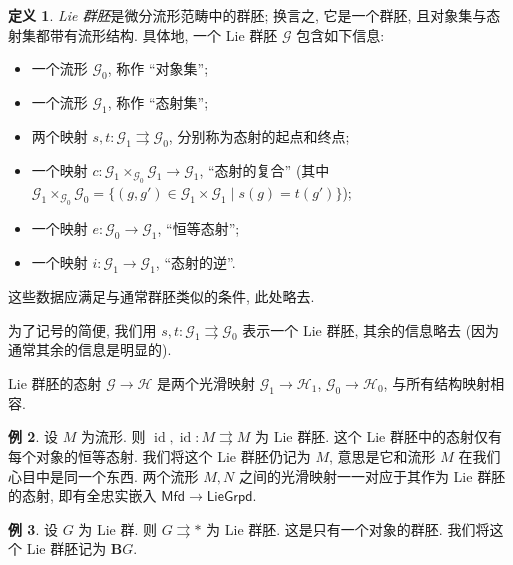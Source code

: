 \documentclass{article}
\theoremstyle{definition}
\newtheorem{definition}{定义}[section]
\newtheorem{example}[definition]{例}
\newcommand{\Mfd}{\mathsf{Mfd}}
\newcommand{\LieGrpd}{\mathsf{LieGrpd}}
\begin{document}
	\begin{definition}
		\emph{Lie 群胚}是微分流形范畴中的群胚; 换言之, 它是一个群胚, 且对象集与态射集都带有流形结构. 具体地, 一个 Lie 群胚 $\mathcal G$ 包含如下信息:
		\begin{itemize}
			\item 一个流形 $\mathcal G_0$, 称作 ``对象集'';
			\item 一个流形 $\mathcal G_1$, 称作 ``态射集'';
			\item 两个映射 $s,t\colon \mathcal G_1\rightrightarrows \mathcal G_0$, 分别称为态射的起点和终点;
			\item 一个映射 $c\colon \mathcal G_1\times_{\mathcal G_0} \mathcal G_1\to \mathcal G_1$, ``态射的复合'' (其中 $\mathcal G_1\times_{\mathcal G_0} \mathcal G_0 = \{(g,g')\in \mathcal G_1\times \mathcal G_1\mid s(g)=t(g')\}$);
			\item 一个映射 $e\colon \mathcal G_0\to \mathcal G_1$, ``恒等态射'';
			\item 一个映射 $i\colon \mathcal G_1\to \mathcal G_1$, ``态射的逆''.
		\end{itemize}
		这些数据应满足与通常群胚类似的条件, 此处略去.
		
		为了记号的简便, 我们用 $s,t\colon \mathcal G_1\rightrightarrows \mathcal G_0$ 表示一个 Lie 群胚, 其余的信息略去 (因为通常其余的信息是明显的).
		
		Lie 群胚的态射 $\mathcal G\to\mathcal H$ 是两个光滑映射 $\mathcal G_1\to\mathcal H_1$, $\mathcal G_0\to\mathcal H_0$, 与所有结构映射相容.
	\end{definition}
	
	
	\begin{example}
		设 $M$ 为流形. 则 $\operatorname{id},\operatorname{id}\colon M\rightrightarrows M$ 为 Lie 群胚. 这个 Lie 群胚中的态射仅有每个对象的恒等态射. 我们将这个 Lie 群胚仍记为 $M$, 意思是它和流形 $M$ 在我们心目中是同一个东西. 两个流形 $M,N$ 之间的光滑映射一一对应于其作为 Lie 群胚的态射, 即有全忠实嵌入 $\Mfd\to\LieGrpd$.
	\end{example}
	
	\begin{example}
		设 $G$ 为 Lie 群. 则 $G\rightrightarrows *$ 为 Lie 群胚. 这是只有一个对象的群胚. 我们将这个 Lie 群胚记为 $\mathbf BG$.
	\end{example}
	
\end{document}
